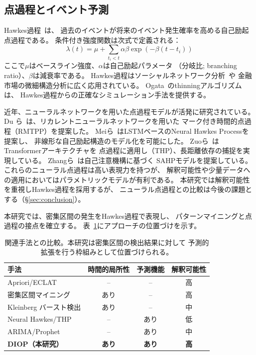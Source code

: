 \subsection{点過程とイベント予測}

Hawkes過程~\cite{hawkes1971spectra}は、
過去のイベントが将来のイベント発生確率を高める自己励起点過程である。
条件付き強度関数は次式で定義される：
\begin{equation}
  \lambda(t) = \mu + \sum_{t_i < t} \alpha \beta \exp(-\beta(t - t_i))
\end{equation}
ここで$\mu$はベースライン強度、$\alpha$は自己励起パラメータ
（分岐比; branching ratio）、$\beta$は減衰率である。
Hawkes過程はソーシャルネットワーク分析~\cite{zhou2013learning}や
金融市場の微細構造分析に広く応用されている。
Ogata~\cite{ogata1981lewis}のthinningアルゴリズムは、
Hawkes過程からの正確なシミュレーション手法を提供する。

近年、ニューラルネットワークを用いた点過程モデルが活発に研究されている。
Du ら~\cite{du2016recurrent}は、リカレントニューラルネットワークを用いた
マーク付き時間的点過程（RMTPP）を提案した。
Meiら~\cite{mei2017neural}はLSTMベースのNeural Hawkes Processを提案し、
非線形な自己励起構造のモデル化を可能にした。
Zuoら~\cite{zuo2020transformer}はTransformerアーキテクチャを
点過程に適用し（THP）、長距離依存の捕捉を実現している。
Zhangら~\cite{zhang2020self}は自己注意機構に基づく
SAHPモデルを提案している。
これらのニューラル点過程は高い表現力を持つが、
解釈可能性や少量データへの適用においてはパラメトリックモデルが有利である。
本研究では解釈可能性を重視しHawkes過程を採用するが、
ニューラル点過程との比較は今後の課題とする（\S\ref{sec:conclusion}）。

本研究では、密集区間の発生をHawkes過程で表現し、
パターンマイニングと点過程の接点を確立する。
表~\ref{tab:related_comparison}にアプローチの位置づけを示す。

\begin{table}[t]
  \centering
  \caption{関連手法との比較。本研究は密集区間の検出結果に対して
  予測的拡張を行う枠組みとして位置づけられる。}
  \label{tab:related_comparison}
  \begin{tabular}{lccc}
    \toprule
    手法 & 時間的局所性 & 予測機能 & 解釈可能性 \\
    \midrule
    Apriori/ECLAT & -- & -- & 高 \\
    密集区間マイニング & あり & -- & 高 \\
    Kleinberg バースト検出 & あり & -- & 中 \\
    Neural Hawkes/THP & -- & あり & 低 \\
    ARIMA/Prophet & -- & あり & 中 \\
    \textbf{DIOP（本研究）} & \textbf{あり} & \textbf{あり} & \textbf{高} \\
    \bottomrule
  \end{tabular}
\end{table}

